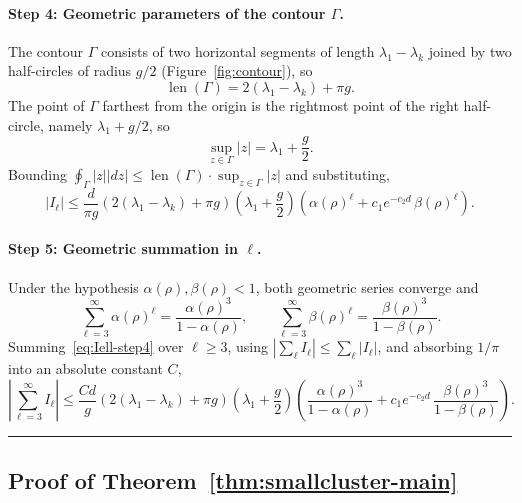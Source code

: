 \documentclass{article}
\newcommand{\BlackBox}{\rule{1.5ex}{1.5ex}}  %
\newenvironment{proof}{\par\noindent{\bf Proof\ }}{\hfill\BlackBox\par\medskip}
\newcommand{\rbr}[1]{\left(#1\right)}
\newcommand{\abr}[1]{\left|#1\right|}
\begin{document}
\begin{proof}
\paragraph{Step 4: Geometric parameters of the contour $\Gamma$.}
The contour $\Gamma$ consists of two horizontal segments of length $\lambda_1-\lambda_k$ joined by two half-circles of radius $g/2$ (Figure~\ref{fig:contour}), so
\begin{equation*}
    \operatorname{len}(\Gamma) = 2(\lambda_1-\lambda_k)+\pi g.
\end{equation*}
The point of $\Gamma$ farthest from the origin is the rightmost point of the right half-circle, namely $\lambda_1+g/2$, so
\begin{equation*}
    \sup_{z\in\Gamma}\abr{z} = \lambda_1+\frac{g}{2}.
\end{equation*}
Bounding $\oint_\Gamma\abr{z}\abr{dz}\le\operatorname{len}(\Gamma)\cdot\sup_{z\in\Gamma}\abr{z}$ and substituting,
\begin{equation}\label{eq:Iell-step4}
    \abr{I_\ell} \le \frac{d}{\pi g}\rbr{2(\lambda_1-\lambda_k)+\pi g}\rbr{\lambda_1+\frac{g}{2}}\rbr{\alpha(\rho)^\ell+c_1 e^{-c_2 d}\,\beta(\rho)^\ell}.
\end{equation}

\paragraph{Step 5: Geometric summation in $\ell$.}
Under the hypothesis $\alpha(\rho),\beta(\rho)<1$, both geometric series converge and
\begin{equation*}
    \sum_{\ell=3}^{\infty}\alpha(\rho)^\ell = \frac{\alpha(\rho)^3}{1-\alpha(\rho)}, \qquad \sum_{\ell=3}^{\infty}\beta(\rho)^\ell = \frac{\beta(\rho)^3}{1-\beta(\rho)}.
\end{equation*}
Summing~\eqref{eq:Iell-step4} over $\ell\ge 3$, using $\abr{\sum_\ell I_\ell}\le\sum_\ell\abr{I_\ell}$, and absorbing $1/\pi$ into an absolute constant $C$,
\begin{equation*}
    \abr{\sum_{\ell=3}^{\infty}I_\ell} \le \frac{Cd}{g}\rbr{2(\lambda_1-\lambda_k)+\pi g}\rbr{\lambda_1+\frac{g}{2}}\rbr{\frac{\alpha(\rho)^3}{1-\alpha(\rho)}+c_1 e^{-c_2 d}\,\frac{\beta(\rho)^3}{1-\beta(\rho)}}.
\end{equation*}
\end{proof}

\subsection{Proof of Theorem~\ref{thm:smallcluster-main}}\label{app:smallcluster-main}
\end{document}

